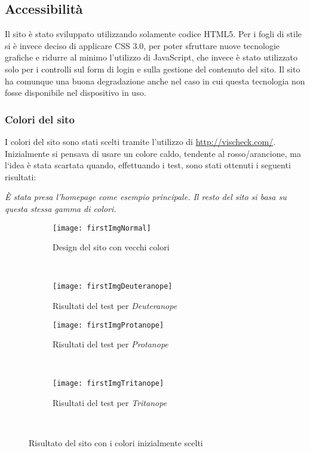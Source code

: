 \graphicspath{ {res/img/} }

\subsection{Accessibilità}
Il sito è stato sviluppato utilizzando solamente codice HTML5. Per i fogli di stile si è invece deciso di applicare CSS 3.0, per poter sfruttare nuove tecnologie grafiche e ridurre al minimo l'utilizzo di JavaScript, che invece è stato utilizzato solo per i controlli sul form di login e sulla gestione del contenuto del sito. Il sito ha comunque una buona degradazione anche nel caso in cui questa tecnologia non fosse disponibile nel dispositivo in uso.

\subsubsection{Colori del sito}
I colori del sito sono stati scelti tramite l'utilizzo di \url{http://vischeck.com/}. Inizialmente si pensava di usare un colore caldo, tendente al rosso/arancione, ma l`idea \`e stata scartata quando, effettuando i test, sono stati ottenuti i seguenti risultati:

\textit{\`E stata presa l'homepage come esempio principale. Il resto del sito si basa su questa stessa gamma di colori.}

\begin{figure}[H]
    \centering
    \begin{subfigure}[b]{0.45\textwidth}
        \texttt{[image: firstImgNormal]}
        \caption{Design del sito con vecchi colori}
    \end{subfigure}
    ~
    \begin{subfigure}[b]{0.45\textwidth}
        \texttt{[image: firstImgDeuteranope]}
        \caption{Risultati del test per \textit{Deuteranope}}
    \end{subfigure}
    \newline
    \begin{subfigure}[b]{0.45\textwidth}
        \texttt{[image: firstImgProtanope]}
        \caption{Risultati del test per \textit{Protanope}}
    \end{subfigure}
    ~
    \begin{subfigure}[b]{0.45\textwidth}
        \texttt{[image: firstImgTritanope]}
        \caption{Risultati del test per \textit{Tritanope}}
    \end{subfigure}
    ~
    \caption{Risultato del sito con i colori inizialmente scelti}
\end{figure}


